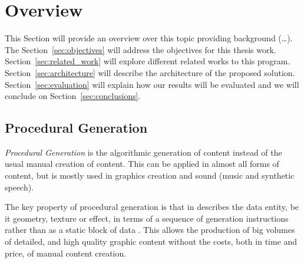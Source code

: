 
% 
% 

\section{Overview} %
\label{sec:overview}


This Section will provide an overview over this topic providing background (\dots). The Section~\ref{sec:objectives} will address the objectives for this thesis work. Section~\ref{sec:related_work} will explore different related works to this program. Section~\ref{sec:architecture} will describe the architecture of the proposed solution. Section~\ref{sec:evaluation} will explain how our results will be evaluated and we will conclude on Section~\ref{sec:conclusions}.

\subsection{Procedural Generation} %
\label{sub:procedural_generation}


\emph{Procedural Generation} is the algorithmic generation of content instead of the usual manual creation of content. This can be applied in almost all forms of content, but is mostly used in graphics creation and sound (music and synthetic speech).

The key property of procedural generation is that in describes the data entity, be it geometry, texture or effect, in terms of a sequence of generation instructions rather than as a static block of data \cite{Kelly}. This allows the production of big volumes of detailed, and high quality graphic content without the costs, both in time and price, of manual content creation.







